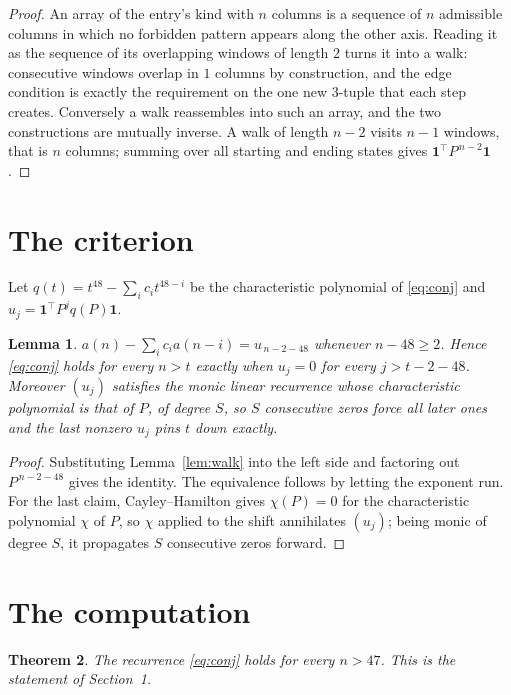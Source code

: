 \documentclass[11pt,a4paper]{article}
\theoremstyle{plain}
\newtheorem{theorem}{Theorem}
\newtheorem{lemma}[theorem]{Lemma}
\theoremstyle{definition}
\begin{document}
\begin{proof}
An array of the entry's kind with $n$ columns is a sequence of $n$ admissible columns in
which no forbidden pattern appears along the other axis. Reading it as the sequence of its
overlapping windows of length $2$ turns it into a walk: consecutive windows overlap in
$1$ columns by construction, and the edge condition is exactly the requirement on the one
new $3$-tuple that each step creates. Conversely a walk reassembles into such an array,
and the two constructions are mutually inverse. A walk of length $n-2$ visits $n-1$
windows, that is $n$ columns; summing over all starting and ending states gives
$\mathbf{1}^{\!\top}P^{\,n-2}\mathbf{1}$.
\end{proof}

\section{The criterion}

Let $q(t)=t^{48}-\sum_i c_i t^{48-i}$ be the characteristic polynomial of
\eqref{eq:conj} and $u_j=\mathbf{1}^{\!\top}P^{j}q(P)\mathbf{1}$.

\begin{lemma}\label{lem:crit}
$a(n)-\sum_i c_i a(n-i)=u_{\,n-2-48}$ whenever $n-48\ge2$. Hence
\eqref{eq:conj} holds for every $n>t$ exactly when $u_j=0$ for every
$j>t-2-48$. Moreover $(u_j)$ satisfies the monic linear recurrence whose
characteristic polynomial is that of $P$, of degree $S$, so $S$ consecutive zeros force all
later ones and the last nonzero $u_j$ pins $t$ down exactly.
\end{lemma}

\begin{proof}
Substituting Lemma~\ref{lem:walk} into the left side and factoring out
$P^{\,n-2-48}$ gives the identity. The equivalence follows by letting the exponent
run. For the last claim, Cayley--Hamilton gives $\chi(P)=0$ for the characteristic
polynomial $\chi$ of $P$, so $\chi$ applied to the shift annihilates $(u_j)$; being monic of
degree $S$, it propagates $S$ consecutive zeros forward.
\end{proof}

\section{The computation}

\begin{theorem}
The recurrence \eqref{eq:conj} holds for every $n>47$. This is the statement of
Section~1.
\end{theorem}
\end{document}
